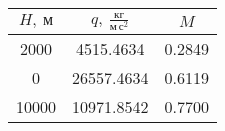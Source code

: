 \begin{tabular}{|c|c|c|}
\hline
 $H,\ м$ &  $q,\ \frac{кг}{м\,с^2}$ &    $M$ \\
\hline
    2000 &                4515.4634 & 0.2849 \\
       0 &               26557.4634 & 0.6119 \\
   10000 &               10971.8542 & 0.7700 \\
\hline
\end{tabular}
